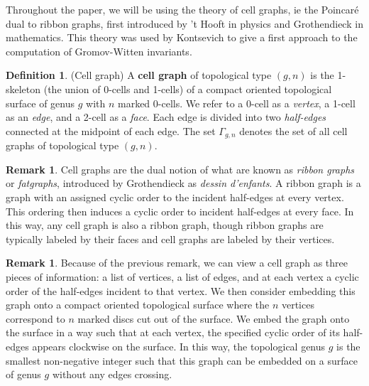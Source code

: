 \documentclass{amsart}
\theoremstyle{definition}
\newtheorem{Def}[Lem]{Definition}
\newtheorem{Rmk}[Lem]{Remark}
\begin{document}
Throughout the paper, we will be using the theory of cell graphs,  ie the Poincar\'e dual to ribbon graphs, first introduced by 't Hooft \cite{Hooft} in physics and Grothendieck \cite{Grothendieck} in mathematics. This theory was used by Kontsevich \cite{Kontsevich_intersection} to give a first approach to the computation of Gromov-Witten invariants. 
\begin{Def}
    (Cell graph) A \textbf{cell graph} of topological type $(g,n)$ is the 1-skeleton (the union of 0-cells and 1-cells) of a compact oriented topological surface of genus $g$ with $n$ marked 0-cells. We refer to a 0-cell as a \textit{vertex}, a 1-cell as an \textit{edge}, and a 2-cell as a \textit{face}. Each edge is divided into two \textit{half-edges} connected at the midpoint of each edge. The set $\Gamma_{g,n}$ denotes the set of all cell graphs of topological type $(g,n)$.
\end{Def}
\begin{Rmk}
    Cell graphs are the dual notion of what are known as \textit{ribbon graphs} or \textit{fatgraphs}, introduced by Grothendieck \cite{Grothendieck} as \textit{dessin d'enfants}. A ribbon graph is a graph with an assigned cyclic order to the incident half-edges at every vertex. This ordering then induces a cyclic order to incident half-edges at every face. In this way, any cell graph is also a ribbon graph, though ribbon graphs are typically labeled by their faces and cell graphs are labeled by their vertices.
\end{Rmk}
\begin{Rmk}
Because of the previous remark, we can view a cell graph as three pieces of information: a list of vertices, a list of edges, and at each vertex a cyclic order of the half-edges incident to that vertex. We then consider embedding this graph onto a compact oriented topological surface where the $n$ vertices correspond to $n$ marked discs cut out of the surface. We embed the graph onto the surface in a way such that at each vertex, the specified cyclic order of its half-edges appears clockwise on the surface. In this way, the topological genus $g$ is the smallest non-negative integer such that this graph can be embedded on a surface of genus $g$ without any edges crossing.
\end{Rmk}
\end{document}

